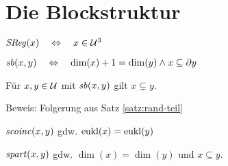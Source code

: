 \section{Die Blockstruktur}

\begin{dfn}
    $\mathit{S\hspace*{-0.25ex}Reg}(x) \quad \Leftrightarrow \quad x \in \mathcal{U}^3$ 
\end{dfn}

\begin{dfn}
    $\mathit{sb}(x,y) \quad \Leftrightarrow \quad \dim(x)+1 = \dim(y) \land x \subseteq \partial y$
\end{dfn}

\begin{satz}\label{satz:sb-teil}
    Für $x,y \in \mathcal{U}$ mit $\mathit{sb}(x,y)$ gilt $x \subsetneq y$.
\end{satz}
Beweis: Folgerung aus Satz \ref{satz:rand-teil}

\begin{dfn}
    $\mathit{scoinc}(x,y)$ gdw. $\text{eukl}(x) = \text{eukl}(y)$
\end{dfn}

\begin{dfn}
    $\mathit{spart}(x,y)$ gdw. $\dim(x) = \dim(y)$ und $x \subseteq y$.
\end{dfn}



